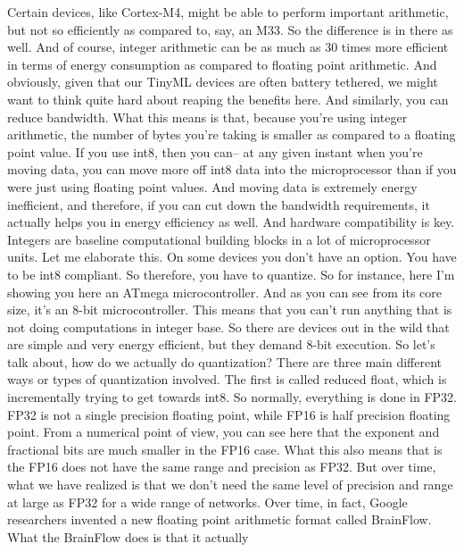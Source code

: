 {{{{{    Certain devices, like Cortex-M4, might be
    able to perform important arithmetic, but not
    so efficiently as compared to, say, an M33.
    So the difference is in there as well.
    And of course, integer arithmetic can be as much as 30 times more efficient
    in terms of energy consumption as compared to floating point arithmetic.
    And obviously, given that our TinyML devices are often battery tethered,
    we might want to think quite hard about reaping the benefits here.
    And similarly, you can reduce bandwidth.
    What this means is that, because you're using integer arithmetic,
    the number of bytes you're taking is smaller as
    compared to a floating point value.
    If you use int8, then you can-- at any given instant when you're moving data,
    you can move more off int8 data into the microprocessor than
    if you were just using floating point values.
    And moving data is extremely energy inefficient,
    and therefore, if you can cut down the bandwidth requirements,
    it actually helps you in energy efficiency as well.
    And hardware compatibility is key.
    Integers are baseline computational building blocks
    in a lot of microprocessor units.
    Let me elaborate this.
    On some devices you don't have an option.
    You have to be int8 compliant.
    So therefore, you have to quantize.
    So for instance, here I'm showing you here an ATmega microcontroller.
    And as you can see from its core size, it's an 8-bit microcontroller.
    This means that you can't run anything that is not
    doing computations in integer base.
    So there are devices out in the wild that
    are simple and very energy efficient, but they demand 8-bit execution.
    So let's talk about, how do we actually do quantization?
    There are three main different ways or types of quantization involved.
    The first is called reduced float, which is incrementally
    trying to get towards int8.
    So normally, everything is done in FP32.
    FP32 is not a single precision floating point,
    while FP16 is half precision floating point.
    From a numerical point of view, you can see here
    that the exponent and fractional bits are much smaller in the FP16 case.
    What this also means that is the FP16 does not
    have the same range and precision as FP32.
    But over time, what we have realized is that we
    don't need the same level of precision and range at large as FP32
    for a wide range of networks.
    Over time, in fact, Google researchers invented a new floating point
    arithmetic format called BrainFlow.
    What the BrainFlow does is that it actually
}}}}}
